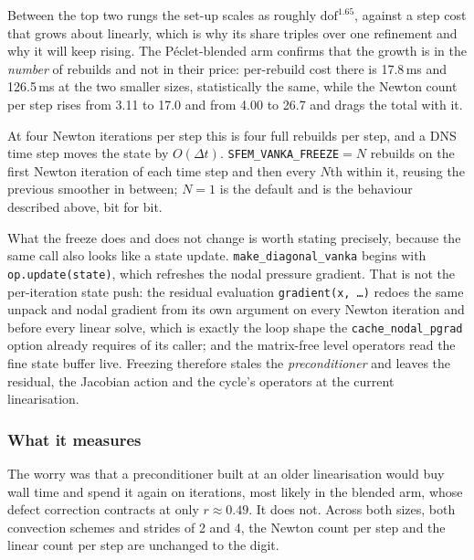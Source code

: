 \documentclass[11pt,a4paper]{article}
\newcommand{\code}[1]{\texttt{\small #1}}
\begin{document}
Between the top two rungs the set-up scales as roughly $\text{dof}^{1.65}$, against a step cost
that grows about linearly, which is why its share triples over one refinement and why it will
keep rising. The Péclet-blended arm confirms that the growth is in the \emph{number} of rebuilds
and not in their price: per-rebuild cost there is 17.8\,ms and 126.5\,ms at the two smaller
sizes, statistically the same, while the Newton count per step rises from 3.11 to 17.0 and from
4.00 to 26.7 and drags the total with it.

At four Newton iterations per step this is four full rebuilds per step, and a DNS time step moves
the state by $O(\Delta t)$. \code{SFEM\_VANKA\_FREEZE}$=N$ rebuilds on the first Newton iteration
of each time step and then every $N$th within it, reusing the previous smoother in between;
$N=1$ is the default and is the behaviour described above, bit for bit.

What the freeze does and does not change is worth stating precisely, because the same call also
looks like a state update. \code{make\_diagonal\_vanka} begins with \code{op.update(state)},
which refreshes the nodal pressure gradient. That is not the per-iteration state push: the
residual evaluation \code{gradient(x,\,\ldots)} redoes the same unpack and nodal gradient from
its own argument on every Newton iteration and before every linear solve, which is exactly the
loop shape the \code{cache\_nodal\_pgrad} option already requires of its caller; and the
matrix-free level operators read the fine state buffer live. Freezing therefore stales the
\emph{preconditioner} and leaves the residual, the Jacobian action and the cycle's operators at
the current linearisation.

\subsubsection*{What it measures}

The worry was that a preconditioner built at an older linearisation would buy wall time and spend
it again on iterations, most likely in the blended arm, whose defect correction contracts at only
$r \approx 0.49$. It does not. Across both sizes, both convection schemes and strides of 2 and 4,
the Newton count per step and the linear count per step are unchanged to the digit.
\end{document}
